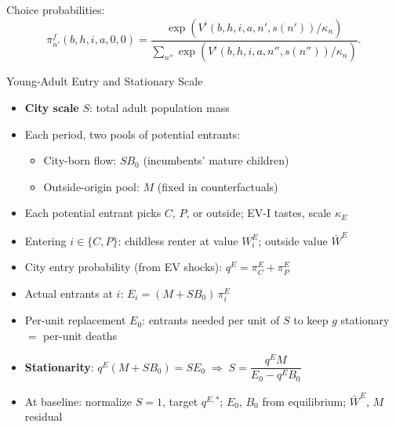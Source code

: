 \documentclass[11pt,aspectratio=169]{beamer}
\begin{document}
\begin{frame}[t]{%
%
%
%
%
}
{{\medskip
Choice probabilities:
\[
\pi_{n'}^{f}(b,h,i,a,0,0)
=
\frac{\exp\!\left(V^{i}(b,h,i,a,n',s(n'))/\kappa_n\right)}
{\sum_{n''}\exp\!\left(V^{i}(b,h,i,a,n'',s(n''))/\kappa_n\right)}.
\]
}
}
\end{frame}

\begin{frame}[t]{Young-Adult Entry and Stationary Scale \; \hyperlink{app:entry_shares_probs}{}}
\label{slide:entry_stationarity}
\footnotesize
\setlength{\abovedisplayskip}{4pt}\setlength{\belowdisplayskip}{4pt}

\begin{itemize}\setlength\itemsep{3pt}
  \item \textbf{City scale} $S$: total adult population mass
  \item Each period, two pools of potential entrants:
    \begin{itemize}\setlength\itemsep{1pt}
      \item City-born flow: $SB_0$ (incumbents' mature children)
      \item Outside-origin pool: $M$ (fixed in counterfactuals)
    \end{itemize}
  \item Each potential entrant picks $C$, $P$, or outside; EV-I tastes, scale $\kappa_E$
  \item Entering $i\in\{C,P\}$: childless renter at value $W_i^E$; outside value $\bar W^E$
  \item City entry probability (from EV shocks): $q^E=\pi_C^E+\pi_P^E$
  \item Actual entrants at $i$: $E_i=(M+SB_0)\,\pi_i^E$
  \item Per-unit replacement $E_0$: entrants needed per unit of $S$ to keep $g$ stationary $=$ per-unit deaths
  \item \textbf{Stationarity}: $q^E(M+SB_0)=SE_0\;\Rightarrow\;S=\dfrac{q^E M}{E_0-q^E B_0}$
  \item At baseline: normalize $S=1$, target $q^{E,*}$; $E_0$, $B_0$ from equilibrium; $\bar W^E$, $M$ residual
\end{itemize}
\end{frame}
\end{document}
